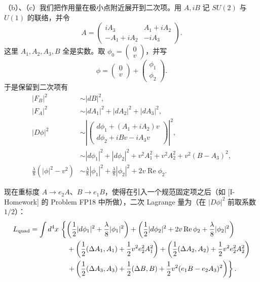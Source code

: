 （b）、（c）我们把作用量在极小点附近展开到二次项。用 $A,iB$ 记 $SU(2)$ 与 $U(1)$ 的联络，并令
\[
A=\begin{pmatrix} iA_3 & A_1+iA_2\\ -A_1+iA_2 & -iA_3\end{pmatrix}.
\]
这里 $A_1,A_2,A_3,B$ 全是实数。取 $\phi_0=\begin{pmatrix}0\\ v\end{pmatrix}$，并写
\[
\phi=\begin{pmatrix}0\\ v\end{pmatrix}+\begin{pmatrix}\phi_1\\ \phi_2\end{pmatrix}.
\]
于是保留到二次项有
\begin{align*}
|F_B|^2&\sim|dB|^2,\\
|F_A|^2&\sim|dA_1|^2+|dA_2|^2+|dA_3|^2,\\
|D\phi|^2&\sim\left|\begin{pmatrix}d\phi_1+(A_1+iA_2)v\\ d\phi_2+iBv-iA_3v\end{pmatrix}\right|^2,\\
&\sim|d\phi_1|^2+|d\phi_2|^2+v^2A_1^2+v^2A_2^2+v^2(B-A_3)^2,\\
\frac{\lambda}{8}(|\phi|^2-v^2)&\sim\frac{\lambda}{8}|\phi_1|^2+\frac{\lambda}{8}|\phi_2|^2+2v\operatorname{Re}\phi_2 .
\end{align*}


现在重标度 $A\to e_2A$、$B\to e_1B$，使得在引入一个规范固定项之后（如 [I-Homework] 的 Problem FP18 中所做），二次 Lagrange 量为（在 $|D\phi|^2$ 前取系数 $1/2$）：
\begin{align*}
L_{\rm quad}=\int d^4x\,&\left\{\left(\frac12|d\phi_1|^2+\frac{\lambda}{8}|\phi_1|^2\right)+\left(\frac12|d\phi_2|^2+2v\operatorname{Re}\phi_2+\frac{\lambda}{8}|\phi_2|^2\right)\right.\\
&\quad+\left(\frac12(\Delta A_1,A_1)+\frac12v^2e_2^2A_1^2\right)+\left(\frac12(\Delta A_2,A_2)+\frac12v^2e_2^2A_2^2\right)\\
&\quad\left.+\left(\frac12(\Delta A_3,A_3)+\frac12(\Delta B,B)+\frac12v^2(e_1B-e_2A_3)^2\right)\right\}.
\end{align*}

